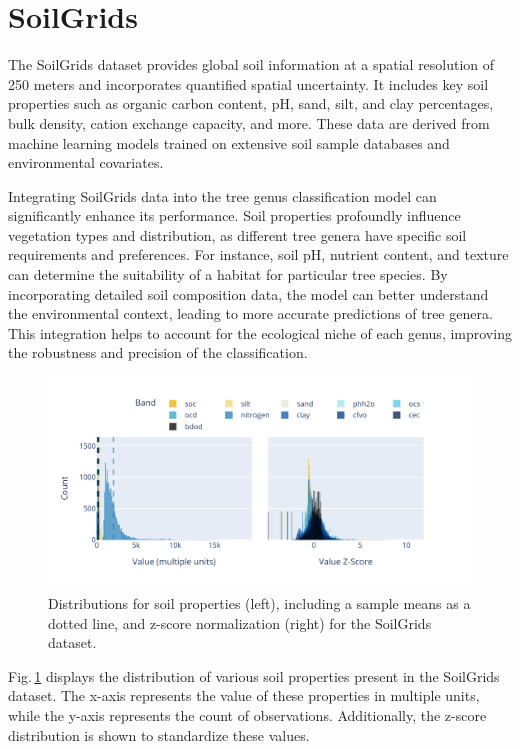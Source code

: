 \section{SoilGrids}

The SoilGrids dataset provides global soil information at a spatial resolution of 250 meters and incorporates quantified spatial uncertainty. It includes key soil properties such as organic carbon content, pH, sand, silt, and clay percentages, bulk density, cation exchange capacity, and more. These data are derived from machine learning models trained on extensive soil sample databases and environmental covariates.

Integrating SoilGrids data into the tree genus classification model can significantly enhance its performance. Soil properties profoundly influence vegetation types and distribution, as different tree genera have specific soil requirements and preferences. For instance, soil pH, nutrient content, and texture can determine the suitability of a habitat for particular tree species. By incorporating detailed soil composition data, the model can better understand the environmental context, leading to more accurate predictions of tree genera. This integration helps to account for the ecological niche of each genus, improving the robustness and precision of the classification.

\begin{figure}[ht]
    \centering
    \includegraphics[width=0.98\linewidth, trim={15pt 25pt 10pt 20pt}, clip]{figures/figures_features/soil_hist.pdf}
    \caption{Distributions for soil properties (left), including a sample means as a dotted line, and z-score normalization (right) for the SoilGrids dataset.}
    \label{fig:soil_hist}
\end{figure}

Fig.\,\ref{fig:soil_hist} displays the distribution of various soil properties present in the SoilGrids dataset. The x-axis represents the value of these properties in multiple units, while the y-axis represents the count of observations. Additionally, the z-score distribution is shown to standardize these values.

